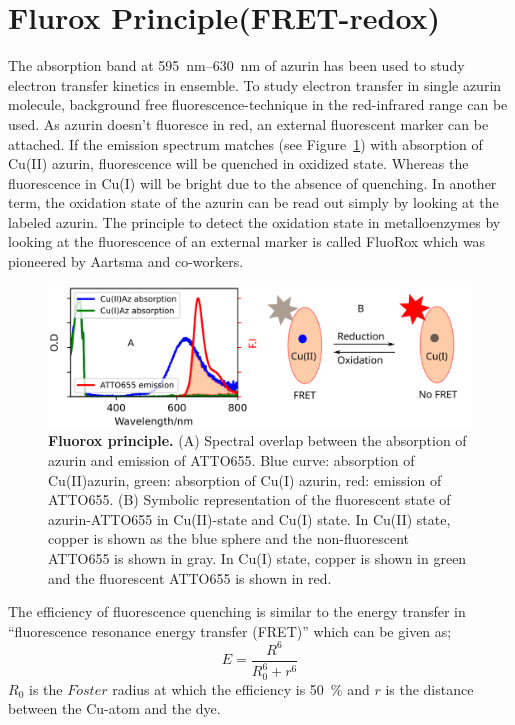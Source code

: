 \section{Flurox Principle(FRET-redox)}
The absorption band at \SIrange{595}{630}{\nm} of azurin has been used to study electron transfer kinetics in ensemble.
To study electron transfer in single azurin molecule, background free fluorescence-technique in the red-infrared range can be used.
As azurin doesn't fluoresce in red, an external fluorescent marker can be attached.
If the emission spectrum matches (see Figure~\ref{fig:flurox_azurin}) with absorption of Cu(II) azurin, fluorescence will be quenched in oxidized state.
Whereas the fluorescence in Cu(I) will be bright due to the absence of quenching.
In another term, the oxidation state of the azurin can be read out simply by looking at the labeled azurin.
The principle to detect the oxidation state in metalloenzymes by looking at the fluorescence of an external marker is called FluoRox which was pioneered by Aartsma and co-workers.\cite{kuznetsova2008the,goldsmith2011redox,tabares2011fluorescence}
\begin{figure}
	\centering
	\includegraphics[width=\textwidth]{flurox_azurin}
	\caption{\textbf{Fluorox principle.} (A) Spectral overlap between the absorption of azurin and emission of ATTO655. Blue curve: absorption of Cu(II)azurin, green: absorption of Cu(I) azurin, red: emission of ATTO655.
	(B) Symbolic representation of the fluorescent state of azurin-ATTO655 in Cu(II)-state and Cu(I) state. In Cu(II) state, copper is shown as the blue sphere and the non-fluorescent ATTO655 is shown in gray. In Cu(I) state, copper is shown in green and the fluorescent ATTO655 is shown in red.}
	\label{fig:flurox_azurin}
\end{figure}
The efficiency of fluorescence quenching is similar to the energy transfer in ``fluorescence resonance energy transfer (FRET)'' which can be given as;
\begin{equation}
	E = \frac{R^6}{R_0^6 + r^6}	
\end{equation}
$R_0$ is the $F\ddot{o}ster$ radius at which the efficiency is \SI{50}{\percent} and $r$ is the distance between the Cu-atom and the dye.
